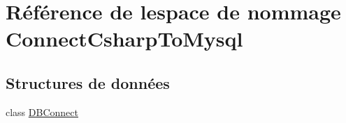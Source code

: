 \hypertarget{namespace_connect_csharp_to_mysql}{}\section{Référence de l\textquotesingle{}espace de nommage Connect\+Csharp\+To\+Mysql}
\label{namespace_connect_csharp_to_mysql}
\subsection*{Structures de données}
\begin{DoxyCompactItemize}
\item 
class \hyperlink{class_connect_csharp_to_mysql_1_1_d_b_connect}{D\+B\+Connect}
\end{DoxyCompactItemize}
